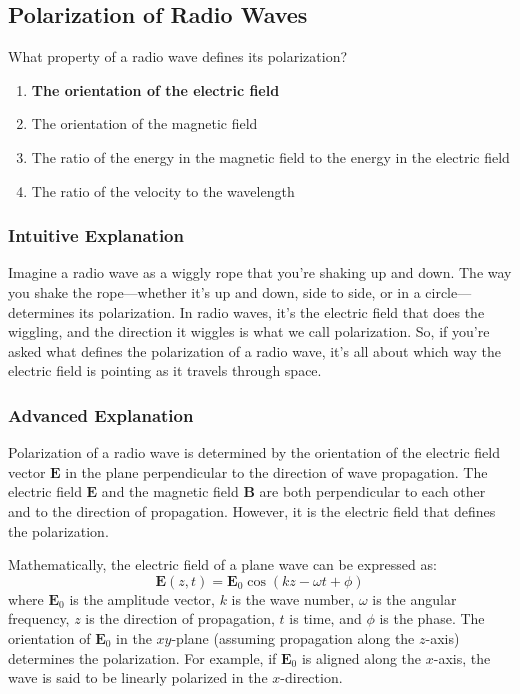 \subsection{Polarization of Radio Waves}
\label{T3B02}

\begin{tcolorbox}[colback=gray!10!white,colframe=black!75!black,title=T3B02]
What property of a radio wave defines its polarization?
\begin{enumerate}[label=\Alph*)]
    \item \textbf{The orientation of the electric field}
    \item The orientation of the magnetic field
    \item The ratio of the energy in the magnetic field to the energy in the electric field
    \item The ratio of the velocity to the wavelength
\end{enumerate}
\end{tcolorbox}

\subsubsection{Intuitive Explanation}
Imagine a radio wave as a wiggly rope that you’re shaking up and down. The way you shake the rope—whether it’s up and down, side to side, or in a circle—determines its polarization. In radio waves, it’s the electric field that does the wiggling, and the direction it wiggles is what we call polarization. So, if you’re asked what defines the polarization of a radio wave, it’s all about which way the electric field is pointing as it travels through space.

\subsubsection{Advanced Explanation}
Polarization of a radio wave is determined by the orientation of the electric field vector \(\mathbf{E}\) in the plane perpendicular to the direction of wave propagation. The electric field \(\mathbf{E}\) and the magnetic field \(\mathbf{B}\) are both perpendicular to each other and to the direction of propagation. However, it is the electric field that defines the polarization. 

Mathematically, the electric field of a plane wave can be expressed as:
\[
\mathbf{E}(z, t) = \mathbf{E}_0 \cos(kz - \omega t + \phi)
\]
where \(\mathbf{E}_0\) is the amplitude vector, \(k\) is the wave number, \(\omega\) is the angular frequency, \(z\) is the direction of propagation, \(t\) is time, and \(\phi\) is the phase. The orientation of \(\mathbf{E}_0\) in the \(xy\)-plane (assuming propagation along the \(z\)-axis) determines the polarization. For example, if \(\mathbf{E}_0\) is aligned along the \(x\)-axis, the wave is said to be linearly polarized in the \(x\)-direction.

